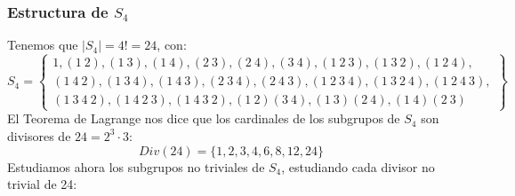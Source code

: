 \subsubsection{Estructura de $S_4$}
Tenemos que $|S_4| = 4! = 24$, con:
\begin{equation*}
    S_4 = \left\{\begin{array}{l}
        1, (1\ 2), (1\ 3), (1\ 4), (2\ 3), (2\ 4), (3\ 4), (1\ 2\ 3), (1\ 3\ 2), (1\ 2\ 4), \\
        (1\ 4\ 2), (1\ 3\ 4), (1\ 4\ 3), (2\ 3\ 4), (2\ 4\ 3), (1\ 2\ 3\ 4), (1\ 3\ 2\ 4), (1\ 2\ 4\ 3), \\
    (1\ 3\ 4\ 2), (1\ 4\ 2\ 3), (1\ 4\ 3\ 2), (1\ 2)(3\ 4), (1\ 3)(2\ 4), (1\ 4)(2\ 3)
    \end{array}\right\}
\end{equation*}
El Teorema de Lagrange nos dice que los cardinales de los subgrupos de $S_4$ son divisores de $24 = 2^3\cdot 3$:
\begin{equation*}
    Div(24) = \{1, 2, 3, 4, 6, 8, 12, 24\}
\end{equation*}
Estudiamos ahora los subgrupos no triviales de $S_4$, estudiando cada divisor no trivial de 24:
